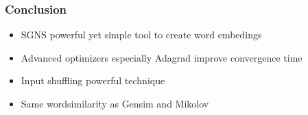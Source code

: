 \begin{frame}
\frametitle{Conclusion} 
\begin{itemize}
\item SGNS powerful yet simple tool to create word embedings
\item Advanced optimizers especially Adagrad improve convergence time 
\item Input shuffling powerful technique
\item Same wordsimilarity as Gensim and Mikolov

\end{itemize}
\end{frame}